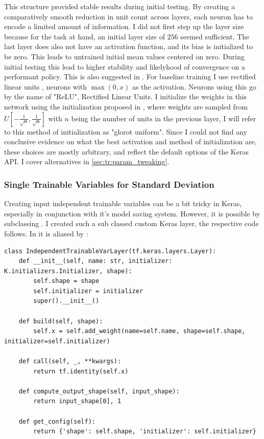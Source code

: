\noindent
This structure provided stable results during initial testing. By creating a comparatively smooth reduction in unit count across layers, each neuron has to encode a limited amount of information. I did not first step up the layer size because for the task at hand, an initial layer size of $256$ seemed sufficient. The last layer does also not have an activation function, and its bias is initialized to be zero. This leads to untrained initial mean values centered on zero. During initial testing this lead to higher stability and likelyhood of convergence on a performant policy. This is also suggested in . For baseline training I use rectified linear units \cite[pg. 189]{Goodfellow-et-al-2016}, neurons with $\max(0, x)$ as the activation. Neurons using this go by the name of "ReLU", Rectified Linear Units. I initialize the weights in this network using the initialization proposed in \cite[p. 251]{glorot_understanding_2010}, where weights are sampled from $U\left[ -\frac{1}{\sqrt{n}}, \frac{1}{\sqrt{n}} \right]$ with $n$ being the number of units in the previous layer, I will refer to this method of initialization as "glorot uniform". Since I could not find any conclusive evidence on what the best activation and method of initialization are, these choices are mostly arbitrary, and reflect the default options of the Keras API. I cover alternatives in \ref{sec:tr:param_tweaking}.

\subsubsection{Single Trainable Variables for Standard Deviation}\label{subsubsec:ip:agent:policy:std}
Creating input independent trainable variables can be a bit tricky in Keras, especially in conjunction with it's model saving system. However, it is possible by subclassing . I created such a sub classed custom Keras layer, the respective code follows. In it  is aliased by :

\begin{lstlisting}[basicstyle=\footnotesize]
class IndependentTrainableVarLayer(tf.keras.layers.Layer):
    def __init__(self, name: str, initializer: K.initializers.Initializer, shape):
        self.shape = shape
        self.initializer = initializer
        super().__init__()

    def build(self, shape):
        self.x = self.add_weight(name=self.name, shape=self.shape, initializer=self.initializer)

    def call(self, _, **kwargs):
        return tf.identity(self.x)

    def compute_output_shape(self, input_shape):
        return input_shape[0], 1

    def get_config(self):
        return {'shape': self.shape, 'initializer': self.initializer}   
\end{lstlisting}

